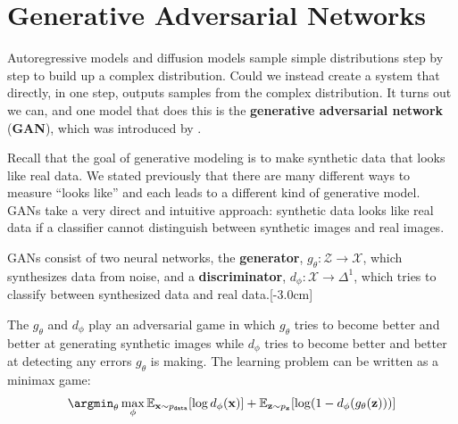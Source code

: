 \section{Generative Adversarial Networks}\label{sec:generative_models:GANs}

Autoregressive models and diffusion models sample simple distributions step by step to build up a complex distribution. Could we instead create a system that directly, in one step, outputs samples from the complex distribution. It turns out we can, and one model that does this is the {\bf generative adversarial network} ({\bf GAN}), which was introduced by \cite{goodfellow2014generative}.

Recall that the goal of generative modeling is to make synthetic data that looks like real data. We stated previously that there are many different ways to measure ``looks like'' and each leads to a different kind of generative model. GANs take a very direct and intuitive approach: synthetic data looks like real data if a classifier cannot distinguish between synthetic images and real images.

GANs consist of two neural networks, the \textbf{generator}, $g_{\theta}: \mathcal{Z} \rightarrow \mathcal{X}$, which synthesizes data from noise, and a \textbf{discriminator}, $d_{\phi}: \mathcal{X} \rightarrow \Delta^1$, which tries to classify between synthesized data and real data.[-3.0cm]

The $g_{\theta}$ and $d_{\phi}$ play an adversarial game in which $g_{\theta}$ tries to become better and better at generating synthetic images while $d_{\phi}$ tries to become better and better at detecting any errors $g_{\theta}$ is making. The learning problem can be written as a minimax game:
\begin{align}
    \argmin_\theta\max_\phi \mathbb{E}_{\mathbf{x} \sim p_{\texttt{data}}}[\log d_{\phi}(\mathbf{x})] + \mathbb{E}_{\mathbf{z} \sim p_{\mathbf{z}}}[\log (1-d_{\phi}(g_{\theta}(\mathbf{z})))]\label{eqn:generative_models:GAN_learning_problem}
\end{align}

